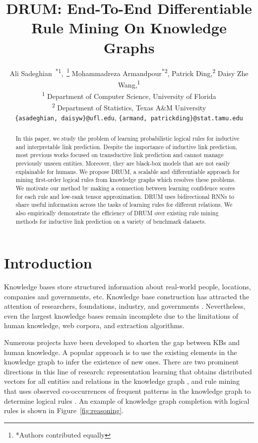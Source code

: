 \documentclass{article}
\title{DRUM: End-To-End Differentiable Rule Mining On Knowledge Graphs}
\author{
        Ali Sadeghian~\textsuperscript{*1},~\thanks{*Authors contributed equally}
        Mohammadreza Armandpour\textsuperscript{*2},
        Patrick Ding,\textsuperscript{2}
        Daisy Zhe Wang,\textsuperscript{1}
        \\
        \textsuperscript{1} Department of Computer Science, University of Florida
        \\
        \textsuperscript{2} Department of Statistics, Texas A\&M University 
        \\
        \texttt{\{asadeghian, daisyw\}@ufl.edu}, \texttt{\{armand, patrickding\}@stat.tamu.edu}
}
\begin{document}
\maketitle

\begin{abstract}
  In this paper, we study the problem of learning probabilistic logical rules for inductive and interpretable link prediction. Despite the importance of inductive link prediction, most previous works focused on transductive link prediction and cannot manage previously unseen entities. Moreover, they are black-box models that are not easily explainable for humans. We propose DRUM, a scalable and differentiable approach for mining first-order logical rules from knowledge graphs which resolves these problems. We motivate our method by making a connection between learning confidence scores for each rule and low-rank tensor approximation. DRUM uses bidirectional RNNs to share useful information across the tasks of learning rules for different relations. We also empirically demonstrate the efficiency of DRUM over existing rule mining methods for inductive link prediction on a variety of benchmark datasets.
\end{abstract}

\section{Introduction}
\label{sec:intro}

Knowledge bases store structured information about real-world people, locations, companies and governments, etc. Knowledge base construction has attracted the attention of researchers, foundations, industry, and governments \citep{dong2014knowledge, ellis2015overview, suchanek2007yago, vrandevcic2014wikidata}. Nevertheless, even the largest knowledge bases remain incomplete due to the limitations of human knowledge, web corpora, and extraction algorithms. 


Numerous projects have been developed to shorten the gap between KBs and human knowledge. A popular approach is to use the existing elements in the knowledge graph to infer the existence of new ones. There are two prominent directions in this line of research: representation learning that obtains distributed vectors for all entities and relations in the knowledge graph \citep{ebisu2018toruse, schlichtkrull2018modeling,  socher2013reasoning}, and rule mining that uses observed co-occurrences of frequent patterns in the knowledge graph to determine logical rules \citep{chen2016ontological, galarraga2015fast}. An example of knowledge graph completion with logical rules is shown in Figure~\ref{fig:reasoning}. 
\end{document}

